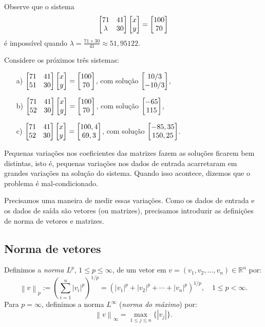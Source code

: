 \begin{ex}\label{ex:sist-mal-cond} Observe que o sistema
\begin{equation}
\begin{bmatrix} 71&41\\\lambda&30 \end{bmatrix}\begin{bmatrix} x \\y \end{bmatrix}=\begin{bmatrix} 100 \\70 \end{bmatrix}
\end{equation}
é impossível quando $\lambda= \frac{71\times 30}{41}\approx 51,95122$.

Considere os próximos três sistemas:
\begin{enumerate}
 \item [a)] $\begin{bmatrix} 71&41\\51&30 \end{bmatrix}\begin{bmatrix} x \\y \end{bmatrix}=\begin{bmatrix} 100 \\70 \end{bmatrix}$, com solução $\begin{bmatrix} 10/3 \\-10/3 \end{bmatrix}$,
 \item [b)] $\begin{bmatrix} 71&41\\52&30 \end{bmatrix}\begin{bmatrix} x \\y \end{bmatrix}=\begin{bmatrix} 100 \\70 \end{bmatrix}$, com solução $\begin{bmatrix} -65 \\115 \end{bmatrix}$,
 \item [c)] $\begin{bmatrix} 71&41\\52&30 \end{bmatrix}\begin{bmatrix} x \\y \end{bmatrix}=\begin{bmatrix} 100,4 \\69,3 \end{bmatrix}$, com solução $\begin{bmatrix} -85,35 \\150,25 \end{bmatrix}$.
\end{enumerate}

Pequenas variações nos coeficientes das matrizes fazem as soluções ficarem bem distintas, isto é, pequenas variações nos dados de entrada acarretaram em grandes variações na solução do sistema. Quando isso acontece, dizemos que o problema é mal-condicionado.
\end{ex}

Precisamos uma maneira de medir essas variações. Como os dados de entrada e os dados de saída são vetores (ou matrizes), precisamos introduzir as definições de norma de vetores e matrizes.

\subsection{Norma de vetores}

Definimos a \emph{norma $L^p$}, $1 \leq p \leq \infty$, de um vetor em $v = (v_1, v_2, \ldots, v_n)\in \mathbb{R}^n$ por:
\begin{equation*}
  \left\|v\right\|_p := \left(\sum_{i=1}^n \left |v_i\right |^p\right)^{1/p} = \left(\left |v_1\right |^p+\left |v_2\right |^p+ \cdots +\left |v_n\right |^p\right)^{1/p},\quad 1\leq p < \infty.
\end{equation*}
Para $p=\infty$, definimos a norma $L^{\infty}$ (\emph{norma do máximo}) por:
\begin{equation*}
  \left\|v\right\|_\infty = \max_{1\leq j\leq n} \{\left |v_j\right |\}.
\end{equation*}

